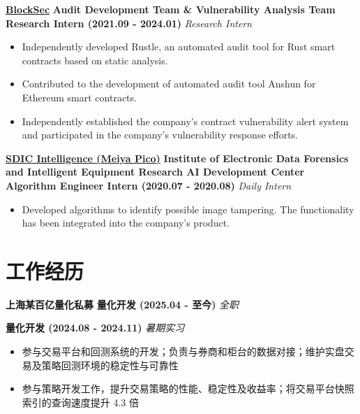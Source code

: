     \noindent \textbf{\href{https://blocksec.com}{BlockSec}} \textbar{} \textbf{Audit Development Team \& Vulnerability Analysis Team} \textbar{} \textbf{Research Intern (2021.09 - 2024.01)} \hfill \textsl{Research Intern}

    \begin{itemize}
        \item Independently developed Rustle, an automated audit tool for Rust smart contracts based on static analysis.
        \item Contributed to the development of automated audit tool Anshun for Ethereum smart contracts.
        \item Independently established the company's contract vulnerability alert system and participated in the company's vulnerability response efforts.
    \end{itemize}

    \noindent \textbf{\href{https://300188.cn}{SDIC Intelligence (Meiya Pico)}} \textbar{} \textbf{Institute of Electronic Data Forensics and Intelligent Equipment Research AI Development Center} \textbar{} \textbf{Algorithm Engineer Intern (2020.07 - 2020.08)} \hfill \textsl{Daily Intern}

    \begin{itemize}
        \item Developed algorithms to identify possible image tampering. The functionality has been integrated into the company's product.
    \end{itemize}

\else

    \section*{工作经历}

    \noindent \textbf{上海某百亿量化私募} \textbar{} \textbf{量化开发 (2025.04 - 至今)} \hfill \textsl{全职}

    \noindent \textbf{\phantom{上海某百亿量化私募}} \textbar{} \textbf{量化开发 (2024.08 - 2024.11)} \hfill \textsl{暑期实习}

    \begin{itemize}
        \item 参与交易平台和回测系统的开发；负责与券商和柜台的数据对接；维护实盘交易及策略回测环境的稳定性与可靠性
        \item 参与策略开发工作，提升交易策略的性能、稳定性及收益率；将交易平台快照索引的查询速度提升 4.3 倍
    \end{itemize}

